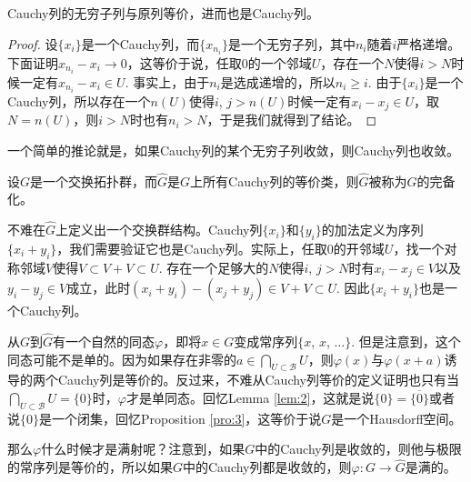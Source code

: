 \begin{lem}
	Cauchy列的无穷子列与原列等价，进而也是Cauchy列。
\end{lem}

\begin{proof}
	设$\{x_i\}$是一个Cauchy列，而$\{x_{n_i}\}$是一个无穷子列，其中$n_i$随着$i$严格递增。下面证明$x_{n_i}-x_i\to 0$，这等价于说，任取$0$的一个邻域$U$，存在一个$N$使得$i>N$时候一定有$x_{n_i}-x_{i}\in U$. 事实上，由于$n_i$是选成递增的，所以$n_i\geq i$. 由于$\{x_i\}$是一个Cauchy列，所以存在一个$n(U)$使得$i$, $j>n(U)$时候一定有$x_i-x_j\in U$，取$N=n(U)$，则$i>N$时也有$n_i>N$，于是我们就得到了结论。
\end{proof}

一个简单的推论就是，如果Cauchy列的某个无穷子列收敛，则Cauchy列也收敛。

\begin{para}[完备化]
	设$G$是一个交换拓扑群，而$\hat G$是$G$上所有Cauchy列的等价类，则$\hat G$被称为$G$的完备化。

	不难在$\hat G$上定义出一个交换群结构。Cauchy列$\{x_i\}$和$\{y_i\}$的加法定义为序列$\{x_i+y_i\}$，我们需要验证它也是Cauchy列。实际上，任取$0$的开邻域$U$，找一个对称邻域$V$使得$V\subset V+V\subset U$. 存在一个足够大的$N$使得$i$, $j>N$时有$x_i-x_j\in V$以及$y_i-y_j\in V$成立，此时$(x_i+y_i)-(x_j+y_j)\in V+V\subset U$. 因此$\{x_i+y_i\}$也是一个Cauchy列。

	从$G$到$\hat G$有一个自然的同态$\varphi$，即将$x\in G$变成常序列$\{x$, $x$, $\dots\}$. 但是注意到，这个同态可能不是单的。因为如果存在非零的$a\in\bigcap_{U\subset \mathscr{B}}U$，则$\varphi(x)$与$\varphi(x+a)$诱导的两个Cauchy列是等价的。反过来，不难从Cauchy列等价的定义证明也只有当$\bigcap_{U\subset \mathscr{B}}U=\{0\}$时，$\varphi$才是单同态。回忆Lemma \ref{lem:2}，这就是说$\{0\}=\overline{\{0\}}$或者说$\{0\}$是一个闭集，回忆Proposition \ref{pro:3}，这等价于说$G$是一个Hausdorff空间。

	那么$\varphi$什么时候才是满射呢？注意到，如果$G$中的Cauchy列是收敛的，则他与极限的常序列是等价的，所以如果$G$中的Cauchy列都是收敛的，则$\varphi:G\to \hat{G}$是满的。
\end{para}


